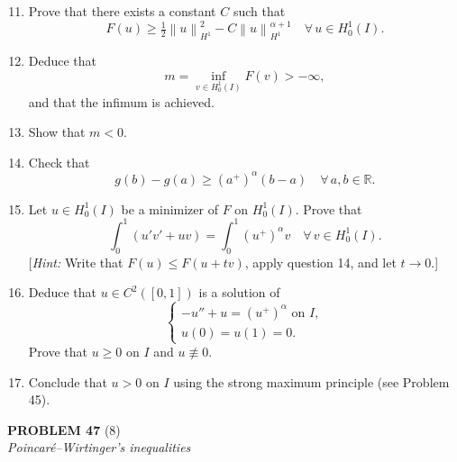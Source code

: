 \documentclass[12pt]{article}
\newcommand{\norm}[1]{\left\|#1\right\|}
\newcommand{\R}{\mathbb{R}}
\begin{document}
\begin{enumerate}
\setcounter{enumi}{10}
\item Prove that there exists a constant $C$ such that
\[
F(u) \ge \tfrac{1}{2}\norm{u}_{H^1}^2 - C\norm{u}_{H^1}^{\alpha+1} \quad \forall\, u \in H^1_0(I).
\]
 
\item Deduce that
\[
m = \inf_{v \in H^1_0(I)} F(v) > -\infty,
\]
and that the infimum is achieved.
 
 
\item Show that $m < 0$.
 
 
\item Check that
\[
g(b) - g(a) \ge (a^+)^\alpha (b-a) \quad \forall\, a, b \in \R.
\]
 
\item Let $u \in H^1_0(I)$ be a minimizer of $F$ on $H^1_0(I)$. Prove that
\[
\int_0^1 (u'v' + uv) = \int_0^1 (u^+)^\alpha v \quad \forall\, v \in H^1_0(I).
\]
[\textit{Hint:} Write that $F(u) \le F(u + tv)$, apply question 14, and let $t \to 0$.]
 
\item Deduce that $u \in C^2([0,1])$ is a solution of
\begin{equation}\tag{5}
\begin{cases}
-u'' + u = (u^+)^\alpha \text{ on } I,\\
u(0) = u(1) = 0.
\end{cases}
\end{equation}
Prove that $u \ge 0$ on $I$ and $u \not\equiv 0$.
 
\item Conclude that $u > 0$ on $I$ using the strong maximum principle (see Problem 45).
\end{enumerate}
 
\bigskip
 
\noindent\textbf{PROBLEM 47} (8)\\[4pt]
\textit{Poincar\'e--Wirtinger's inequalities}
 
\end{document}
